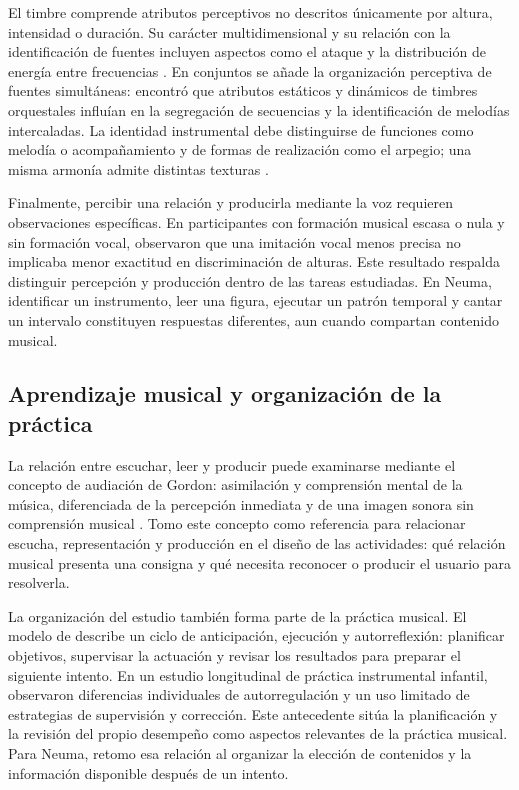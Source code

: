 El timbre comprende atributos perceptivos no descritos únicamente por altura,
intensidad o duración. Su carácter multidimensional y su relación con la
identificación de fuentes incluyen aspectos como el ataque y la distribución
de energía entre frecuencias \parencite{mcadams2013timbre}. En conjuntos se añade
la organización perceptiva de fuentes simultáneas: \textcite{iverson1995streams}
encontró que atributos estáticos y dinámicos de timbres orquestales influían en
la segregación de secuencias y la identificación de melodías intercaladas.
La identidad instrumental debe distinguirse de funciones como melodía o
acompañamiento y de formas de realización como el arpegio; una misma armonía
admite distintas texturas \parencite[sección~14.3]{hutchinsonIntervalos}.

Finalmente, percibir una relación y producirla mediante la voz requieren
observaciones específicas. En participantes con formación musical escasa o nula
y sin formación vocal, \textcite{pfordresher2007singing} observaron que una
imitación vocal menos precisa no implicaba menor exactitud en discriminación
de alturas. Este resultado respalda distinguir percepción y producción dentro
de las tareas estudiadas. En Neuma, identificar un instrumento, leer una figura,
ejecutar un patrón temporal y cantar un intervalo constituyen respuestas
diferentes, aun cuando compartan contenido musical.

\subsection{Aprendizaje musical y organización de la práctica}
\label{sec:aprendizaje-practica}
\label{sec:aprendizaje-musical}
\label{sec:autorregulacion}
\label{sec:desempeno-aprendizaje}
\label{sec:practica-distribuida}
\label{sec:feedback-andamiaje}
\label{sec:referencias-melodicas}
La relación entre escuchar, leer y producir puede examinarse mediante el concepto
de audiación de Gordon: asimilación y comprensión mental de la música, diferenciada
de la percepción inmediata y de una imagen sonora sin comprensión musical
\parencite[pp.~3--4]{gordon2012sequences}. Tomo este concepto como referencia para
relacionar escucha, representación y producción en el diseño de las actividades:
qué relación musical presenta una consigna y qué necesita reconocer o producir
el usuario para resolverla.

La organización del estudio también forma parte de la práctica musical. El modelo
de \textcite[pp.~67--68]{zimmerman2002selfregulated} describe un ciclo de anticipación,
ejecución y autorreflexión: planificar objetivos, supervisar la actuación y revisar
los resultados para preparar el siguiente intento. En un estudio longitudinal
de práctica instrumental infantil, \textcite{mcpherson2001practice} observaron
diferencias individuales de autorregulación y un uso limitado de estrategias
de supervisión y corrección. Este antecedente sitúa la planificación y la revisión
del propio desempeño como aspectos relevantes de la práctica musical. Para Neuma,
retomo esa relación al organizar la elección de contenidos y la información
disponible después de un intento.

